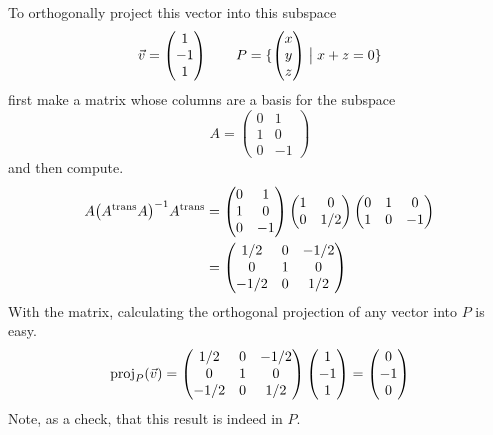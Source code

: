 \begin{example}
To orthogonally project this vector into this subspace
\begin{equation*}
  \vec{v}=\colvec{1 \\ -1 \\ 1}
  \qquad
  P=\set{\colvec{x \\ y \\ z}\suchthat x+z=0}
\end{equation*}
first make a matrix whose columns are a basis for the subspace
\begin{equation*}
  A=\begin{pmatrix}
      0  &1  \\
      1  &0  \\
      0  &-1
    \end{pmatrix}
\end{equation*}
and then compute.
\begin{align*}
  A\bigl(\trans{A}A\bigr)^{-1}\trans{A}
  &=\begin{pmatrix}
      0  &1  \\
      1  &0  \\
      0  &-1
    \end{pmatrix}
    \begin{pmatrix}
      1    &0  \\
      0    &1/2
    \end{pmatrix}
    \begin{pmatrix}
      0   &1  &0  \\
      1   &0  &-1 
    \end{pmatrix}             \\
    &=
    \begin{pmatrix}
      1/2     &0  &-1/2  \\
      0     &1    &0   \\
      -1/2  &0    &1/2
    \end{pmatrix}
\end{align*}
With the matrix, calculating the orthogonal projection of any vector into $P$
is easy.
\begin{equation*}
  \proj{\vec{v}}{P}=
    \begin{pmatrix}
      1/2     &0  &-1/2  \\
      0     &1    &0   \\
      -1/2  &0    &1/2
    \end{pmatrix}
    \colvec{1 \\ -1 \\ 1}
    =\colvec{0 \\ -1 \\ 0}
\end{equation*}
Note, as a check, that this result is indeed in $P$.
\end{example}

